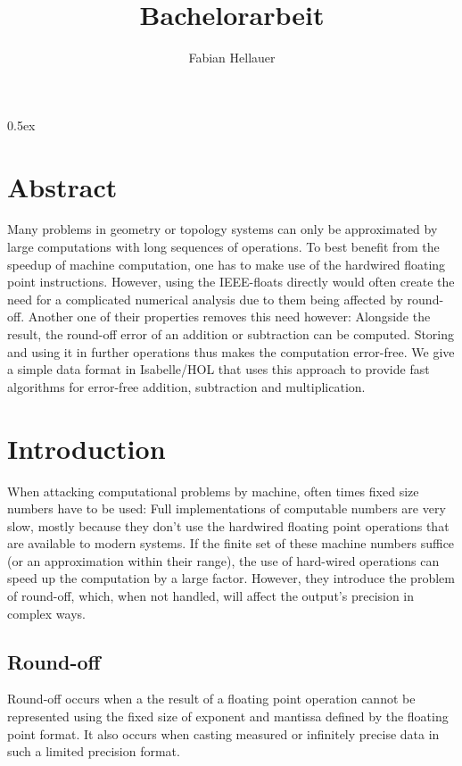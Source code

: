 \documentclass[11pt,a4paper]{article}
\begin{document}
\title{Bachelorarbeit}
\author{Fabian Hellauer}
\maketitle

\tableofcontents

\parindent 0pt\parskip 0.5ex

\section{Abstract}

Many problems in geometry or topology systems can only be approximated by large computations with long sequences of operations. To best benefit from the speedup of machine computation, one has to make use of the hardwired floating point instructions. However, using the IEEE-floats directly would often create the need for a complicated numerical analysis due to them being affected by round-off.
Another one of their properties removes this need however: Alongside the result, the round-off error of an addition or subtraction can be computed. Storing and using it in further operations thus makes the computation error-free.
We give a simple data format in Isabelle/HOL that uses this approach to provide fast algorithms for error-free addition, subtraction and multiplication.

\section{Introduction}

When attacking computational problems by machine, often times fixed size numbers have to be used: Full implementations of computable numbers are very slow, mostly because they don't use the hardwired floating point operations that are available to modern systems. If the finite set of these machine numbers suffice (or an approximation within their range), the use of hard-wired operations can speed up the computation by a large factor. However, they introduce the problem of round-off, which, when not handled, will affect the output's precision in complex ways.

\subsection{Round-off}
Round-off occurs when a the result of a floating point operation cannot be represented using the fixed size of exponent and mantissa defined by the floating point format. It also occurs when casting measured or infinitely precise data in such a limited precision format.
\end{document}
